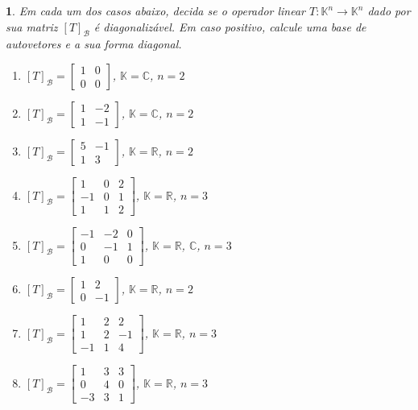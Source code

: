\documentclass[12pt]{exam}
\newtheorem{exercicio}{}
\newcommand{\real}{\mathbb{R}}
\newcommand{\complex}{\mathbb{C}}
\newcommand{\cp}[1]{\mathbb{#1}}
\begin{document}
\begin{exercicio}
  Em cada um dos casos abaixo, decida se o operador linear $T : \cp{K}^n \to \cp{K}^n$ dado por sua matriz $[T]_\mathcal{B}$ \'e diagonaliz\'avel. Em caso positivo, calcule uma base de autovetores e a sua forma diagonal.
  \begin{enumerate}[label=({\alph*})]
    \item $[T]_\mathcal{B} = \begin{bmatrix} 1 & 0\\ 0 & 0\end{bmatrix}$, $\cp{K} = \complex$, $n = 2$
    \item $[T]_\mathcal{B} = \begin{bmatrix} 1 & -2\\ 1 & -1\end{bmatrix}$, $\cp{K} = \complex$, $n = 2$
    \item $[T]_\mathcal{B} = \begin{bmatrix} 5 & -1\\ 1 & 3\end{bmatrix}$, $\cp{K} = \real$, $n = 2$
    \item $[T]_\mathcal{B} = \begin{bmatrix} 1 & 0 & 2\\ -1 & 0 & 1\\ 1 & 1 & 2\end{bmatrix}$, $\cp{K} = \real$, $n = 3$
    \item $[T]_\mathcal{B} = \begin{bmatrix} -1 & -2 & 0\\ 0 & -1 & 1\\ 1 & 0 & 0\end{bmatrix}$, $\cp{K} = \real$, $\complex$, $n = 3$
    \item $[T]_\mathcal{B} = \begin{bmatrix} 1 & 2\\ 0 & -1\end{bmatrix}$, $\cp{K} = \real$, $n = 2$
    \item $[T]_\mathcal{B} = \begin{bmatrix} 1 & 2 & 2\\ 1 & 2 & -1\\ -1 & 1 & 4\end{bmatrix}$, $\cp{K} = \real$, $n = 3$
    \item $[T]_\mathcal{B} = \begin{bmatrix} 1 & 3 & 3\\ 0 & 4 & 0\\ -3 & 3 & 1\end{bmatrix}$, $\cp{K} = \real$, $n = 3$

\end{enumerate}
\end{exercicio}
\end{document}
